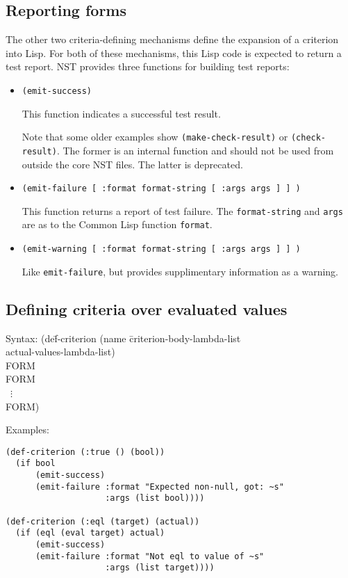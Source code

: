 \subsection{Reporting forms}
\label{sec:criteria-forms-report}
The other two criteria-defining mechanisms define the expansion of a
criterion into Lisp.  For both of these mechanisms, this Lisp code is
expected to return a test report.  NST provides three functions for
building test reports:
\begin{itemize}
\item\texttt{(emit-success)}%
  \par This function indicates a successful test result.
  \par Note that some older examples show \texttt{(make-check-result)}
  or \texttt{(check-result)}.  The former is an internal function and
  should not be used from outside the core NST files.  The latter is
  deprecated.
\item\texttt{(emit-failure [ :format format-string [ :args args ] ] )}%
  \par This function returns a report of test failure.  The
  \texttt{format-string} and \texttt{args} are as to the Common Lisp
  function \texttt{format}.
\item\texttt{(emit-warning [ :format format-string [ :args args ] ] )}%
  \par Like \texttt{emit-failure}, but provides supplimentary
  information as a warning.
\end{itemize}

\subsection{Defining criteria over evaluated values}
\label{sec:def-criterion}
{\ttfamily\begin{tabbing}
\textrm{Syntax: }(de\=f-criterion (name \=criterion-body-lambda-list
\\ \>            \>actual-values-lambda-list)
\\ \> FORM
\\ \> FORM
\\ \> ~$\vdots$
\\ \> FORM)
\end{tabbing}}%

Examples:
\begin{verbatim}
(def-criterion (:true () (bool))
  (if bool
      (emit-success)
      (emit-failure :format "Expected non-null, got: ~s"
                    :args (list bool))))

(def-criterion (:eql (target) (actual))
  (if (eql (eval target) actual)
      (emit-success)
      (emit-failure :format "Not eql to value of ~s"
                    :args (list target))))
\end{verbatim}

